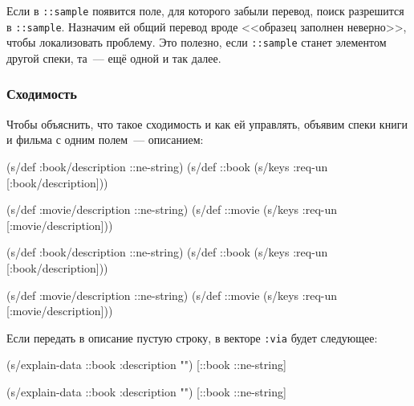 \fi

Если в \verb|::sample| появится поле, для которого забыли перевод, поиск
разрешится в \verb|::sample|. Назначим ей общий перевод вроде <<образец
заполнен неверно>>, чтобы локализовать проблему. Это полезно, если
\verb|::sample| станет элементом другой спеки, та~--- ещё одной и так далее.

\subsubsection{Сходимость}

Чтобы объяснить, что такое сходимость и как ей управлять, объявим спеки книги и
фильма с одним полем~--- описанием:

\ifx\devicetype\mobile

\begin{english}
  \begin{clojure}
(s/def :book/description ::ne-string)
(s/def ::book
  (s/keys :req-un [:book/description]))

(s/def :movie/description ::ne-string)
(s/def ::movie
  (s/keys :req-un [:movie/description]))
  \end{clojure}
\end{english}

\else

\begin{english}
  \begin{clojure}
(s/def :book/description ::ne-string)
(s/def ::book (s/keys :req-un [:book/description]))

(s/def :movie/description ::ne-string)
(s/def ::movie (s/keys :req-un [:movie/description]))
  \end{clojure}
\end{english}

\fi

Если передать в описание пустую строку, в векторе \verb|:via| будет следующее:

\ifx\devicetype\mobile

\begin{english}
  \begin{clojure}
(s/explain-data ::book
  {:description ""})
[::book ::ne-string]
  \end{clojure}
\end{english}

\else

\begin{english}
  \begin{clojure}
(s/explain-data ::book {:description ""})
[::book ::ne-string]
  \end{clojure}
\end{english}

